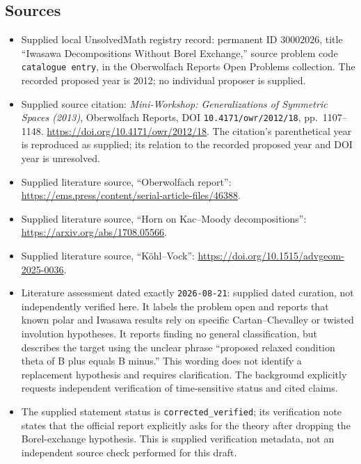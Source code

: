 \documentclass[11pt]{article}
\begin{document}
\subsection{Sources}
\begin{itemize}
\item Supplied local UnsolvedMath registry record: permanent ID \(30002026\), title ``Iwasawa Decompositions Without Borel Exchange,'' source problem code \texttt{catalogue entry}, in the Oberwolfach Reports Open Problems collection. The recorded proposed year is 2012; no individual proposer is supplied.
\item Supplied source citation: \emph{Mini-Workshop: Generalizations of Symmetric Spaces (2013)}, Oberwolfach Reports, DOI \texttt{10.4171/owr/2012/18}, pp.~1107--1148. \url{https://doi.org/10.4171/owr/2012/18}. The citation's parenthetical year is reproduced as supplied; its relation to the recorded proposed year and DOI year is unresolved.
\item Supplied literature source, ``Oberwolfach report'': \url{https://ems.press/content/serial-article-files/46388}.
\item Supplied literature source, ``Horn on Kac--Moody decompositions'': \url{https://arxiv.org/abs/1708.05566}.
\item Supplied literature source, ``Köhl--Vock'': \url{https://doi.org/10.1515/advgeom-2025-0036}.
\item Literature assessment dated exactly \texttt{2026-08-21}: supplied dated curation, not independently verified here. It labels the problem open and reports that known polar and Iwasawa results rely on specific Cartan--Chevalley or twisted involution hypotheses. It reports finding no general classification, but describes the target using the unclear phrase ``proposed relaxed condition theta of B plus equals B minus.'' This wording does not identify a replacement hypothesis and requires clarification. The background explicitly requests independent verification of time-sensitive status and cited claims.
\item The supplied statement status is \texttt{corrected\_verified}; its verification note states that the official report explicitly asks for the theory after dropping the Borel-exchange hypothesis. This is supplied verification metadata, not an independent source check performed for this draft.
\end{itemize}
\end{document}
